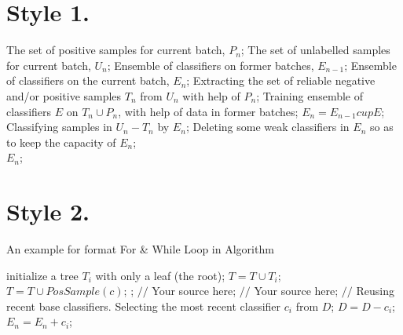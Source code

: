 \documentclass[UTF8]{article}
\begin{document}
\section{Style 1.}

\begin{algorithm}[htb]


\label{alg:Framwork}
\begin{algorithmic}[1]
\Require
The set of positive samples for current batch, $P_n$;
The set of unlabelled samples for current batch, $U_n$;
Ensemble of classifiers on former batches, $E_{n-1}$;
\Ensure
Ensemble of classifiers on the current batch, $E_n$;
\State Extracting the set of reliable negative and/or positive samples $T_n$ from $U_n$ with help of $P_n$;
\label{code:fram:extract}
\State Training ensemble of classifiers $E$ on $T_n \cup P_n$, with help of data in former batches;
\label{code:fram:trainbase}
\State $E_n=E_{n-1}cup E$;
\label{code:fram:add}
\State Classifying samples in $U_n-T_n$ by $E_n$;
\label{code:fram:classify}
\State Deleting some weak classifiers in $E_n$ so as to keep the capacity of $E_n$;
\label{code:fram:select} \\
\Return $E_n$;
\end{algorithmic}
\end{algorithm}


\section{Style 2.}

\begin{algorithm}[h]
\caption{An example for format For \& While Loop in Algorithm}
\begin{algorithmic}[1]
\State initialize a tree $T_{i}$ with only a leaf (the root);
\State $T=T\cup T_{i};$
\EndFor
{}
\label{code:TrainBase:getc}
\State $T=T\cup PosSample(c)$;
\label{code:TrainBase:pos}
\EndFor;
\State $//$ Your source here;
\EndFor
{}
\State $//$ Your source here;
\EndFor
\State $//$ Reusing recent base classifiers.
\label{code:recentStart}
\State Selecting the most recent classifier $c_i$ from $D$;
\State $D=D-c_i$;
\State $E_n=E_n+c_i$;
\EndWhile
\label{code:recentEnd}
\end{algorithmic}
\end{algorithm}
\end{document}
